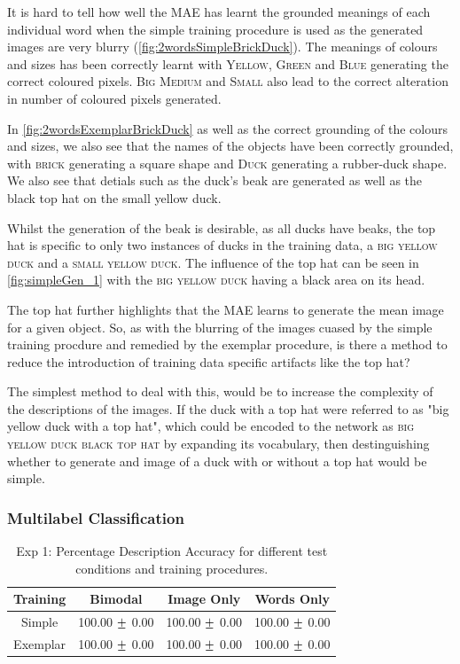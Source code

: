 It is hard to tell how well the MAE has learnt the grounded meanings of each individual word when the simple training procedure is used as the generated images are very blurry (\autoref{fig:2wordsSimpleBrickDuck}). The meanings of colours and sizes has been correctly learnt with \textsc{Yellow}, \textsc{Green} and  \textsc{Blue} generating the correct coloured pixels. \textsc{Big} \textsc{Medium} and \textsc{Small} also lead to the correct alteration in number of coloured pixels generated.

In \autoref{fig:2wordsExemplarBrickDuck} as well as the correct grounding of the colours and sizes, we also see that the names of the objects have been correctly grounded, with \textsc{brick} generating a square shape and \textsc{Duck} generating a rubber-duck shape. We also see that detials such as the duck's beak are generated as well as the black top hat on the small yellow duck.

Whilst the generation of the beak is desirable, as all ducks have beaks, the top hat is specific to only two instances of ducks in the training data, a \textsc{big yellow duck} and a \textsc{small yellow duck}. The influence of the top hat can be seen in \autoref{fig:simpleGen_1} with the 
\textsc{big yellow duck} having a black area on its head.

The top hat further highlights that the MAE learns to generate the mean image for a given object. So, as with the blurring of the images cuased by the simple training procdure and remedied by the exemplar procedure, is there a method to reduce the introduction of training data specific artifacts like the top hat?

The simplest method to deal with this, would be to increase the complexity of the descriptions of the images. If the duck with a top hat were referred to as "big yellow duck with a top hat", which could be encoded to the network as \textsc{big yellow duck black top hat} by expanding its vocabulary, then destinguishing whether to generate and image of a duck with or without a top hat would be simple.


\subsubsection{Multilabel Classification}


\begin{table}[h!]
\centering
	\begin{tabular}{|c|c|c|c|}
	\hline
\textbf{Training }	 & 	\textbf{Bimodal} & \textbf{Image Only} 	& 	\textbf{Words Only} \\ \hline
Simple & 100.00 $\mypm$ 0.00 & 100.00 $\mypm$ 0.00 & 100.00 $\mypm$ 0.00 \\ \hline
Exemplar & 100.00 $\mypm$ 0.00 & 100.00 $\mypm$ 0.00 & 100.00 $\mypm$ 0.00 \\ \hline
	\end{tabular}
\caption{Exp 1: Percentage Description Accuracy for different test conditions and training procedures.}
\label{tab:6_res_exp1_acc}
\end{table}

